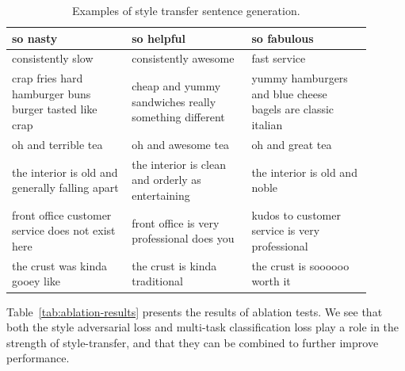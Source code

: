 \documentclass[letterpaper]{article} %
\begin{document}
\begin{table}[ht]
\begin{tabular}{| p{0.3\linewidth} || p{0.3\linewidth} | p{0.3\linewidth} |}
		\hline
		\hline
		so nasty                                               & so helpful                                                     & so fabulous                                                 \\
		\hline
		consistently slow                                      & consistently awesome                                           & fast service                                                \\
		\hline
		crap fries hard hamburger buns burger tasted like crap & cheap and yummy sandwiches really something different          & yummy hamburgers and blue cheese bagels are classic italian \\
		\hline
		oh and terrible tea                                    & oh and awesome tea                                             & oh and great tea                                            \\
		\hline
		the interior is old and generally falling apart        & the interior is clean and orderly as entertaining              & the interior is old and noble                               \\
		\hline
		front office customer service does not exist here      & front office is very professional does you                     & kudos to customer service is very professional              \\
		\hline
		the crust was kinda gooey like                         & the crust is kinda traditional                                 & the crust is soooooo worth it                               \\
		\hline
	\end{tabular}
	\caption{Examples of style transfer sentence generation.}
	\label{tab:transfer-samples}
\end{table}


Table~\ref{tab:ablation-results} presents the results of ablation tests.
We see that both the style adversarial loss and multi-task classification loss play a role in the strength of style-transfer, and that they can be combined to further improve performance.
\end{document}
